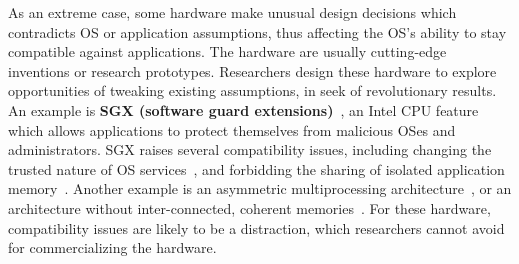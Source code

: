 As an extreme case, some hardware make unusual design decisions which contradicts OS or application assumptions,
thus affecting the OS's ability to stay
compatible against applications.
The hardware are usually cutting-edge inventions or research prototypes.
Researchers design
these hardware
to explore opportunities of tweaking existing assumptions,
in seek of revolutionary results.
An example %
is {\bf SGX (software guard extensions)}~\cite{intelsgx},
an Intel CPU feature which allows applications to protect themselves from malicious OSes and administrators.
SGX raises several compatibility issues, including changing the trusted nature of OS services~\cite{baumann14haven,osdi16scone,tsai17graphene-sgx}, and forbidding the sharing of isolated application memory~\cite{shinde17panoply}.
Another example is an asymmetric multiprocessing architecture~\cite{},
or an architecture without inter-connected, coherent memories~\cite{gschwind2007,cascaval2002evaluation}. 
For these hardware, compatibility issues are likely to be a distraction, which researchers cannot avoid for commercializing the hardware.



